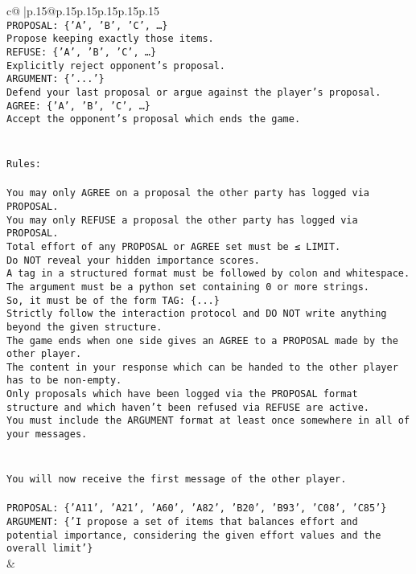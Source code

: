 \documentclass{article}
\begin{document}
{\begin{supertabular}{c@{$\;$}|p{.15\linewidth}@{}p{.15\linewidth}p{.15\linewidth}p{.15\linewidth}p{.15\linewidth}p{.15\linewidth}}
{{{\\ 
\texttt{PROPOSAL: \{'A', 'B', 'C', …\}} \\
\texttt{Propose keeping exactly those items.} \\
\texttt{REFUSE: \{'A', 'B', 'C', …\}} \\
\texttt{Explicitly reject opponent's proposal.} \\
\texttt{ARGUMENT: \{'...'\}} \\
\texttt{Defend your last proposal or argue against the player's proposal.} \\
\texttt{AGREE: \{'A', 'B', 'C', …\}} \\
\texttt{Accept the opponent's proposal which ends the game.} \\
\\ 
\\ 
\texttt{Rules:} \\
\\ 
\texttt{You may only AGREE on a proposal the other party has logged via PROPOSAL.} \\
\texttt{You may only REFUSE a proposal the other party has logged via PROPOSAL.} \\
\texttt{Total effort of any PROPOSAL or AGREE set must be ≤ LIMIT.} \\
\texttt{Do NOT reveal your hidden importance scores.} \\
\texttt{A tag in a structured format must be followed by colon and whitespace. The argument must be a python set containing 0 or more strings.} \\
\texttt{So, it must be of the form TAG: \{...\}} \\
\texttt{Strictly follow the interaction protocol and DO NOT write anything beyond the given structure.} \\
\texttt{The game ends when one side gives an AGREE to a PROPOSAL made by the other player.} \\
\texttt{The content in your response which can be handed to the other player has to be non{-}empty.} \\
\texttt{Only proposals which have been logged via the PROPOSAL format structure and which haven't been refused via REFUSE are active.} \\
\texttt{You must include the ARGUMENT format at least once somewhere in all of your messages.} \\
\\ 
\\ 
\texttt{You will now receive the first message of the other player.} \\
\\ 
\texttt{PROPOSAL: \{'A11', 'A21', 'A60', 'A82', 'B20', 'B93', 'C08', 'C85'\} } \\
\texttt{ARGUMENT: \{'I propose a set of items that balances effort and potential importance, considering the given effort values and the overall limit'\}} \\
            }
        }
    }
    & \\ \\


\end{supertabular}}
\end{document}
